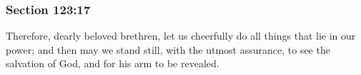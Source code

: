 	\subsubsection{Section 123:17} %
		\label{DC123-17}

		Therefore, dearly beloved brethren, let us cheerfully do all things that lie in our power; and then may we stand still, with the utmost assurance, to see the salvation of God, and for his arm to be revealed.

